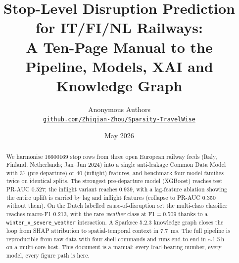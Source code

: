 \documentclass[11pt,a4paper]{article}
\title{\bfseries Stop-Level Disruption Prediction for IT/FI/NL Railways:\\
        \large A Ten-Page Manual to the Pipeline, Models, XAI and Knowledge Graph}
\author{Anonymous Authors\\\small\href{https://github.com/Zhiqian-Zhou/Sparsity-TravelWise}{\texttt{github.com/Zhiqian-Zhou/Sparsity-TravelWise}}}
\date{May 2026}
\begin{document}
\maketitle

\begin{abstract}
\small
We harmonise \num{16600169} stop rows from three open European railway feeds (Italy, Finland, Netherlands; Jan--Jun 2024) into a single anti-leakage Common Data Model with 37 (pre-departure) or 40 (inflight) features, and benchmark four model families twice on identical splits. The strongest pre-departure model (XGBoost) reaches test PR-AUC \num{0.527}; the inflight variant reaches \num{0.939}, with a lag-feature ablation showing the entire uplift is carried by lag and inflight features (collapse to PR-AUC \num{0.350} without them). On the Dutch labelled cause-of-disruption set the multi-class classifier reaches macro-F1 \num{0.213}, with the rare \emph{weather} class at F1$=$\num{0.509} thanks to a \texttt{winter\_x\_severe\_weather} interaction. A Sparksee 5.2.3 knowledge graph closes the loop from SHAP attribution to spatial-temporal context in \SI{7.7}{ms}. The full pipeline is reproducible from raw data with four shell commands and runs end-to-end in $\sim$1.5\,h on a multi-core host. This document is a manual: every load-bearing number, every model, every figure path is here.
\end{abstract}









\end{document}
